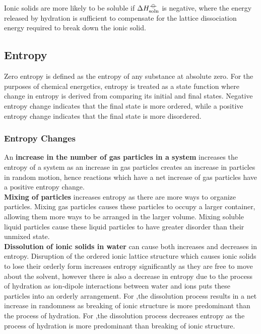 \documentclass[../main]{subfiles}
\begin{document}
	Ionic solids are more likely to be soluble if \(\Delta H_\text{soln}^{-\kern-4pt{\ominus}\kern-4pt-}\) is negative, where the energy released by hydration is sufficient to compensate for the lattice dissociation energy required to break down the ionic solid.

	\subsection{Entropy}


	Zero entropy is defined as the entropy of any substance at absolute zero. For the purposes of chemical energetics, entropy is treated as a state function where change in entropy is derived from comparing its initial and final states. Negative entropy change indicates that the final state is more ordered, while a positive entropy change indicates that the final state is more disordered.

	\subsubsection{Entropy Changes}

	An \textbf{increase in the number of gas particles in a system} increases the entropy of a system as an increase in gas particles creates an increase in particles in random motion, hence reactions which have a net increase of gas particles have a positive entropy change. \\

	\textbf{Mixing of particles} increases entropy as there are more ways to organize particles. Mixing gas particles causes these particles to occupy a larger container, allowing them more ways to be arranged in the larger volume. Mixing soluble liquid particles cause these liquid particles to have greater disorder than their unmixed state. \\

	\textbf{Dissolution of ionic solids in water} can cause both increases and decreases in entropy. Disruption of the ordered ionic lattice structure which causes ionic solids to lose their orderly form increases entropy significantly as they are free to move about the solvent, however there is also a decrease in entropy due to the process of hydration as ion-dipole interactions between water and ions puts these particles into an orderly arrangement. For ,the dissolution process results in a net increase in randomness as breaking of ionic structure is more predominant than the process of hydration. For ,the dissolution process decreases entropy as the process of hydration is more predominant than breaking of ionic structure. \\
\end{document}
